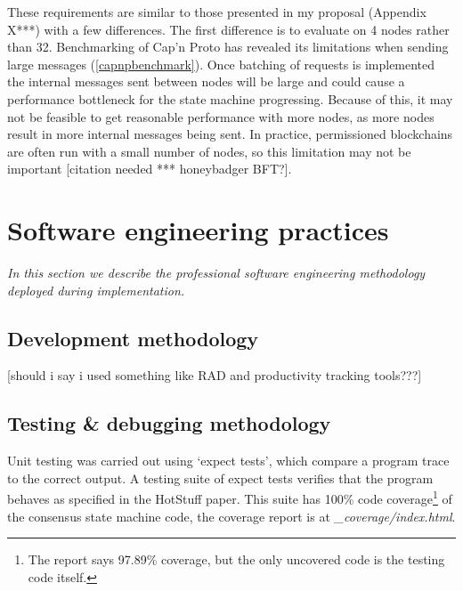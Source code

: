 These requirements are similar to those presented in my proposal (Appendix X***) with a few differences. The first difference is to evaluate on 4 nodes rather than 32. Benchmarking of Cap'n Proto has revealed its limitations when sending large messages (\ref{capnpbenchmark}). Once batching of requests is implemented the internal messages sent between nodes will be large and could cause a performance bottleneck for the state machine progressing. Because of this, it may not be feasible to get reasonable performance with more nodes, as more nodes result in more internal messages being sent. In practice, permissioned blockchains are often run with a small number of nodes, so this limitation may not be important [citation needed *** honeybadger BFT?].


\section{Software engineering practices} \label{softwareeng}

\textit{In this section we describe the professional software engineering methodology deployed during implementation.}

\subsection{Development methodology}
[should i say i used something like RAD and productivity tracking tools???]
\subsection{Testing \& debugging methodology} \label{testing}
Unit testing was carried out using `expect tests', which compare a program trace to the correct output. A testing suite of expect tests verifies that the program behaves as specified in the HotStuff paper. This suite has 100\% code coverage\footnote{The report says 97.89\% coverage, but the only uncovered code is the testing code itself.} of the consensus state machine code, the coverage report is at \textit{\_coverage/index.html}.

